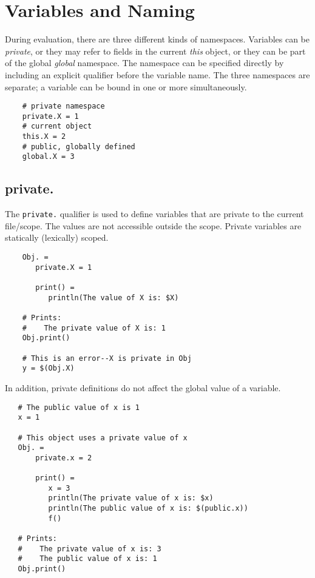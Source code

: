%
\chapter{Variables and Naming}
\label{chapter:naming}

During evaluation, there are three different kinds of namespaces.  Variables can be \emph{private},
or they may refer to fields in the current \emph{this} object, or they can be part of the global
\emph{global} namespace.  The namespace can be specified directly by including an explicit qualifier
before the variable name.  The three namespaces are separate; a variable can be bound in one or more
simultaneously.

\begin{verbatim}
    # private namespace
    private.X = 1
    # current object
    this.X = 2
    # public, globally defined
    global.X = 3
\end{verbatim}

\section{private.}
\label{section:private}

The \verb+private.+ qualifier is used to define variables that are private to the current file/scope.
The values are not accessible outside the scope.  Private variables are statically (lexically) scoped.

\begin{verbatim}
    Obj. =
       private.X = 1

       print() =
          println(The value of X is: $X)

    # Prints:
    #    The private value of X is: 1
    Obj.print()

    # This is an error--X is private in Obj
    y = $(Obj.X)
\end{verbatim}

In addition, private definitions do not affect the global value of a variable.

\begin{verbatim}
   # The public value of x is 1
   x = 1

   # This object uses a private value of x
   Obj. =
       private.x = 2

       print() =
          x = 3
          println(The private value of x is: $x)
          println(The public value of x is: $(public.x))
          f()

   # Prints:
   #    The private value of x is: 3
   #    The public value of x is: 1
   Obj.print()
\end{verbatim}

